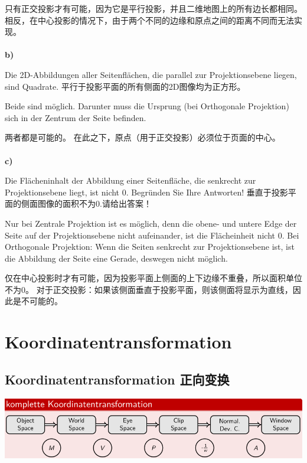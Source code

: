 \documentclass[fleqn]{article}
\begin{document}
只有正交投影才有可能，因为它是平行投影，并且二维地图上的所有边长都相同。相反，在中心投影的情况下，由于两个不同的边缘和原点之间的距离不同而无法实现。
\\
\\
\noindent\textbf{b)} 

Die 2D-Abbildungen aller Seitenflächen, die parallel zur Projektionsebene liegen, sind Quadrate.
平行于投影平面的所有侧面的2D图像均为正方形。

Beide sind möglich. Darunter muss die Ursprung (bei Orthogonale Projektion) sich in der Zentrum der Seite befinden.

两者都是可能的。 在此之下，原点（用于正交投影）必须位于页面的中心。
\\
\\
\noindent\textbf{c)} 

Die Flächeninhalt der Abbildung einer Seitenfläche, die senkrecht zur Projektionsebene liegt, ist nicht 0. Begründen Sie Ihre Antworten!
垂直于投影平面的侧面图像的面积不为0.请给出答案！

Nur bei Zentrale Projektion ist es möglich, denn die obene- und untere Edge der Seite auf der Projektionsebene nicht aufeinander, ist die Flächeinheit nicht 0.
Bei Orthogonale Projektion: Wenn die Seiten senkrecht zur Projektionsebene ist, ist die Abbildung der Seite eine Gerade, deswegen nicht möglich.

仅在中心投影时才有可能，因为投影平面上侧面的上下边缘不重叠，所以面积单位不为0。
对于正交投影：如果该侧面垂直于投影平面，则该侧面将显示为直线，因此是不可能的。

\section{Koordinatentransformation}

\subsection{Koordinatentransformation 正向变换}

\begin{center}
    \includegraphics[scale=0.45]{14.png}
\end{center}
\end{document}

